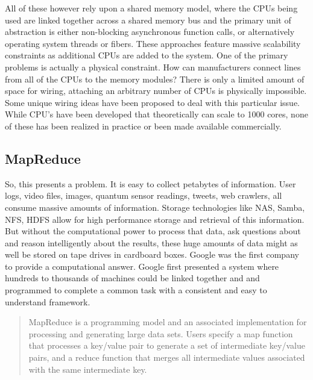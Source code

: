 \documentclass{article}
\begin{document}
All of these however rely upon a shared memory model, where the CPUs being used are linked together across a shared memory bus and the primary unit of abstraction is either non-blocking asynchronous function calls, or alternatively operating system threads or fibers. These approaches feature massive scalability constraints as additional CPUs are added to the system. One of the primary problems is actually a physical constraint. How can manufacturers connect lines from all of the CPUs to the memory modules? There is only a limited amount of space for wiring, attaching an arbitrary number of CPUs is physically impossible. Some unique wiring ideas have been proposed to deal with this particular issue.  While CPU's have been developed that theoretically can scale to 1000 cores, none of these has been realized in practice or been made available commercially. 


\subsection{MapReduce}
So, this presents a problem. It is easy to collect petabytes of information. User logs, video files, images, quantum sensor readings, tweets, web crawlers, all consume massive amounts of information. Storage technologies like NAS, Samba, NFS, HDFS allow for high performance storage and retrieval of this information. But without the computational power to process that data, ask questions about and reason intelligently about the results, these huge amounts of data might as well be stored on tape drives in cardboard boxes. Google was the first company to provide a computational answer. Google first presented a system where hundreds to thousands of machines could be linked together and and programmed to complete a common task with a consistent and easy to understand framework. 

\begin{quotation}
MapReduce is a programming model and an associated implementation for processing and generating large data sets. Users specify a map function that processes a key/value pair to generate a set of intermediate key/value pairs, and a reduce function that merges all intermediate values associated with the same intermediate key. \cite{mapreduce}
\end{quotation} 
\end{document}
